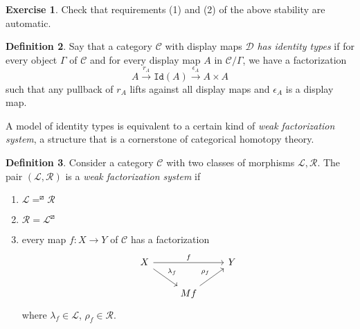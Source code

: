 \documentclass{article}
\theoremstyle{definition}
\newtheorem{definition}{Definition}[section]
\newtheorem{exercise}[definition]{Exercise}
\newcommand{\C}{\mathcal C}
\newcommand{\D}{\mathcal D}
\newcommand{\Id}{\mathtt {Id}}
\begin{document}
\begin{exercise}
    Check that requirements (1) and (2) of the above stability are automatic.
\end{exercise}

\begin{definition}
    Say that a category $\C$ with display maps $\D$ \emph{has identity types} if for every object $\Gamma$ of $\C$ and for every display map $A$ in $\C / \Gamma$, we have a factorization
    \[ A \xrightarrow{r_A} \Id(A) \xrightarrow{\epsilon_A} A \times A \] 
    such that any pullback of $r_A$ lifts against all display maps and $\epsilon_A$ is a display map.
\end{definition}

A model of identity types is equivalent to a certain kind of \emph{weak factorization system}, a structure that is a cornerstone of categorical homotopy theory.

\begin{definition}
    Consider a category $\C$ with two classes of morphisms $\mathcal L, \mathcal R$. The pair $(\mathcal L, \mathcal R)$ is a \emph{weak factorization system} if
    \begin{enumerate}
        \item $\mathcal L = ^\boxslash \mathcal R$
        \item $\mathcal R = \mathcal L^\boxslash$
        \item every map $f: X \to Y$ of $\C$ has a factorization
        \[
             \begin{tikzcd}
                 X \ar[dr, "\lambda_f"] \ar[rr,"f"]& & Y \\
                   & Mf \ar[ur,"\rho_f"]
             \end{tikzcd}
        \]
        where $\lambda_f \in \mathcal L$, $\rho_f \in \mathcal R$.
    \end{enumerate}
\end{definition}
\end{document}
